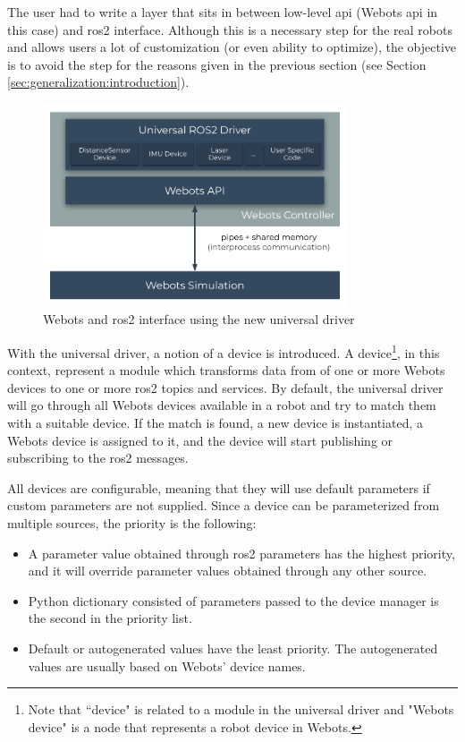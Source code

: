 The user had to write a layer that sits in between low-level \ac{api} (Webots \ac{api} in this case) and \ac{ros2} interface. 
Although this is a necessary step for the real robots and allows users a lot of customization (or even ability to optimize), the objective is to avoid the step for the reasons given in the previous section (see Section \ref{sec:generalization:introduction}).

\begin{figure}[H]
    \centering
    \includegraphics[width=0.8\textwidth]{generalization/figures/universal_driver_within_webots.pdf}
    \caption{Webots and \ac{ros2} interface using the new universal driver}
    \label{fig:generalization:universal_driver_within_webots}
\end{figure}

With the universal driver, a notion of a device is introduced.
A device\footnote{Note that ``device" is related to a module in the universal driver and "Webots device" is a node that represents a robot device in Webots.}, in this context, represent a module which transforms data from of one or more Webots devices to one or more \ac{ros2} topics and services.
By default, the universal driver will go through all Webots devices available in a robot and try to match them with a suitable device.
If the match is found, a new device is instantiated, a Webots device is assigned to it, and the device will start publishing or subscribing to the \ac{ros2} messages.

All devices are configurable, meaning that they will use default parameters if custom parameters are not supplied.
Since a device can be parameterized from multiple sources, the priority is the following:
\begin{itemize}
    \item A parameter value obtained through \ac{ros2} parameters has the highest priority, and it will override parameter values obtained through any other source.
    \item Python dictionary consisted of parameters passed to the device manager is the second in the priority list.
    \item Default or autogenerated values have the least priority. The autogenerated values are usually based on Webots' device names.
\end{itemize}

